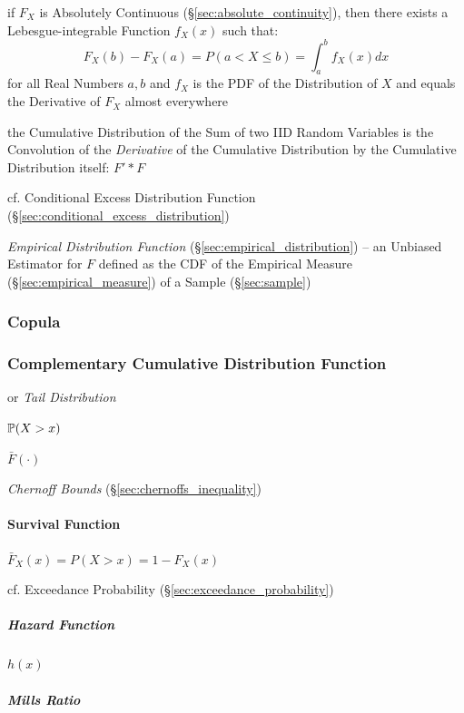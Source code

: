 if $F_X$ is Absolutely Continuous (\S\ref{sec:absolute_continuity}), then there
exists a Lebesgue-integrable Function $f_X(x)$ such that:
\[
  F_X(b) - F_X(a) = P(a < X \leq b) = \int_a^b f_X(x) dx
\]
for all Real Numbers $a, b$ and $f_X$ is the PDF of the Distribution of $X$
and equals the Derivative of $F_X$ almost everywhere

the Cumulative Distribution of the Sum of two IID Random Variables is the
Convolution of the \emph{Derivative} of the Cumulative Distribution by the
Cumulative Distribution itself: $F' * F$

cf. Conditional Excess Distribution Function
(\S\ref{sec:conditional_excess_distribution})

\fist \emph{Empirical Distribution Function}
(\S\ref{sec:empirical_distribution}) -- an Unbiased Estimator for $F$ defined as
the CDF of the Empirical Measure (\S\ref{sec:empirical_measure}) of a Sample
(\S\ref{sec:sample})



\subsubsection{Copula}\label{sec:copula}

\subsubsection{Complementary Cumulative Distribution Function}
\label{sec:tail_distribution}

or \emph{Tail Distribution}

$\mathbb{P}(X > x)$

$\bar{F}(\cdot)$

\emph{Chernoff Bounds} (\S\ref{sec:chernoffs_inequality})



\paragraph{Survival Function}\label{sec:survival_function}\hfill

$\bar{F}_X(x) = P(X > x) = 1 - F_X(x)$

cf. Exceedance Probability (\S\ref{sec:exceedance_probability})



\subparagraph{Hazard Function}\label{sec:hazard_function}\hfill

$h(x)$



\subparagraph{Mills Ratio}\label{sec:mills_ratio}\hfill

